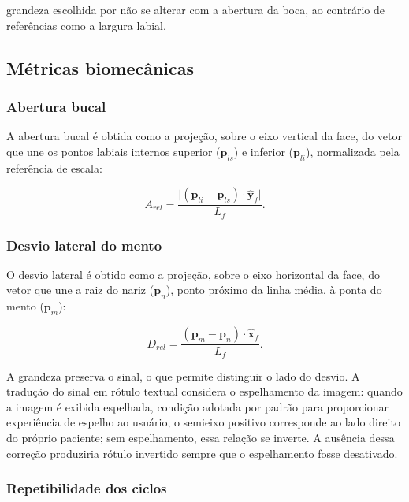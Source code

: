 \documentclass[
    article,
    11pt,
    oneside,
    a4paper,
    english,
    brazil
]{abntex2}
\begin{document}
\noindent
grandeza escolhida por não se alterar com a abertura da boca, ao contrário
de referências como a largura labial.

\subsection{Métricas biomecânicas}

\subsubsection{Abertura bucal}

A abertura bucal é obtida como a projeção, sobre o eixo vertical da face, do
vetor que une os pontos labiais internos superior ($\mathbf{p}_{ls}$) e
inferior ($\mathbf{p}_{li}$), normalizada pela referência de escala:

\begin{equation}
    A_{rel} =
        \frac{\lvert (\mathbf{p}_{li} - \mathbf{p}_{ls}) \cdot
              \hat{\mathbf{y}}_{f} \rvert}{L_{f}} .
    \label{eq:abertura}
\end{equation}

\subsubsection{Desvio lateral do mento}

O desvio lateral é obtido como a projeção, sobre o eixo horizontal da face,
do vetor que une a raiz do nariz ($\mathbf{p}_{n}$), ponto próximo da linha
média, à ponta do mento ($\mathbf{p}_{m}$):

\begin{equation}
    D_{rel} =
        \frac{(\mathbf{p}_{m} - \mathbf{p}_{n}) \cdot
              \hat{\mathbf{x}}_{f}}{L_{f}} .
    \label{eq:desvio}
\end{equation}

A grandeza preserva o sinal, o que permite distinguir o lado do desvio. A
tradução do sinal em rótulo textual considera o espelhamento da imagem:
quando a imagem é exibida espelhada, condição adotada por padrão para
proporcionar experiência de espelho ao usuário, o semieixo positivo
corresponde ao lado direito do próprio paciente; sem espelhamento, essa
relação se inverte. A ausência dessa correção produziria rótulo invertido
sempre que o espelhamento fosse desativado.

\subsubsection{Repetibilidade dos ciclos}
\end{document}
